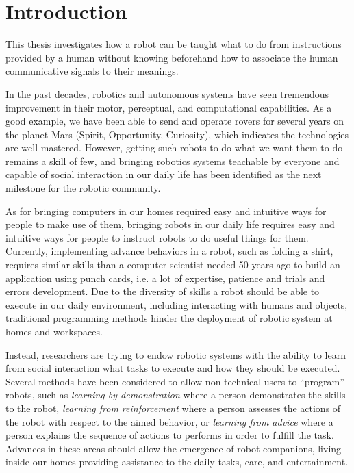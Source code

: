 
\chapter{Introduction}
\label{chapter:introduction}
\minitoc

This thesis investigates how a robot can be taught what to do from instructions provided by a human without knowing beforehand how to associate the human communicative signals to their meanings.

In the past decades, robotics and autonomous systems have seen tremendous improvement in their motor, perceptual, and computational capabilities. As a good example, we have been able to send and operate rovers for several years on the planet Mars (Spirit, Opportunity, Curiosity), which indicates the technologies are well mastered. However, getting such robots to do what we want them to do remains a skill of few, and bringing robotics systems teachable by everyone and capable of social interaction in our daily life has been identified as the next milestone for the robotic community.

As for bringing computers in our homes required easy and intuitive ways for people to make use of them, bringing robots in our daily life requires easy and intuitive ways for people to instruct robots to do useful things for them. Currently, implementing advance behaviors in a robot, such as folding a shirt, requires similar skills than a computer scientist needed 50 years ago to build an application using punch cards, i.e. a lot of expertise, patience and trials and errors development. Due to the diversity of skills a robot should be able to execute in our daily environment, including interacting with humans and objects, traditional programming methods hinder the deployment of robotic system at homes and workspaces.

Instead, researchers are trying to endow robotic systems with the ability to learn from social interaction what tasks to execute and how they should be executed. Several methods have been considered to allow non-technical users to ``program'' robots, such as \emph{learning by demonstration} where a person demonstrates the skills to the robot, \emph{learning from reinforcement} where a person assesses the actions of the robot with respect to the aimed behavior, or \emph{learning from advice} where a person explains the sequence of actions to performs in order to fulfill the task. Advances in these areas should allow the emergence of robot companions, living inside our homes providing assistance to the daily tasks, care, and entertainment.

